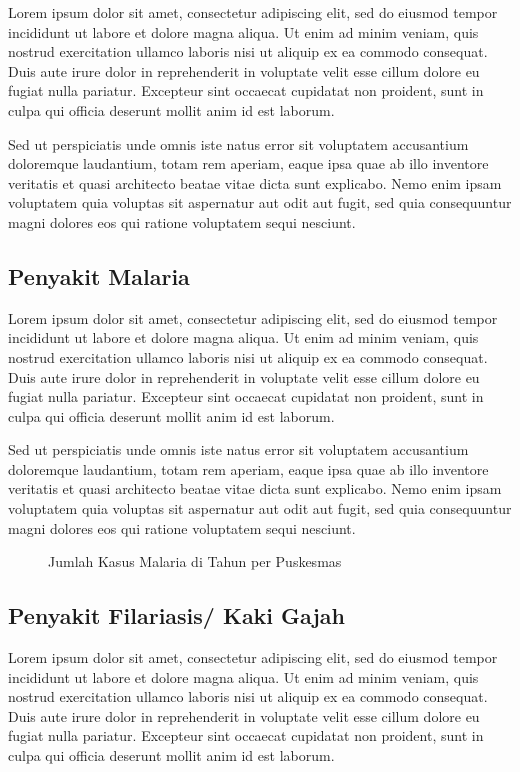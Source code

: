 Lorem ipsum dolor sit amet, consectetur adipiscing elit, sed do eiusmod tempor incididunt ut labore et dolore magna aliqua. Ut enim ad minim veniam, quis nostrud exercitation ullamco laboris nisi ut aliquip ex ea commodo consequat. Duis aute irure dolor in reprehenderit in voluptate velit esse cillum dolore eu fugiat nulla pariatur. Excepteur sint occaecat cupidatat non proident, sunt in culpa qui officia deserunt mollit anim id est laborum.

Sed ut perspiciatis unde omnis iste natus error sit voluptatem accusantium doloremque laudantium, totam rem aperiam, eaque ipsa quae ab illo inventore veritatis et quasi architecto beatae vitae dicta sunt explicabo. Nemo enim ipsam voluptatem quia voluptas sit aspernatur aut odit aut fugit, sed quia consequuntur magni dolores eos qui ratione voluptatem sequi nesciunt.

\subsection{Penyakit Malaria}
Lorem ipsum dolor sit amet, consectetur adipiscing elit, sed do eiusmod tempor incididunt ut labore et dolore magna aliqua. Ut enim ad minim veniam, quis nostrud exercitation ullamco laboris nisi ut aliquip ex ea commodo consequat. Duis aute irure dolor in reprehenderit in voluptate velit esse cillum dolore eu fugiat nulla pariatur. Excepteur sint occaecat cupidatat non proident, sunt in culpa qui officia deserunt mollit anim id est laborum.

Sed ut perspiciatis unde omnis iste natus error sit voluptatem accusantium doloremque laudantium, totam rem aperiam, eaque ipsa quae ab illo inventore veritatis et quasi architecto beatae vitae dicta sunt explicabo. Nemo enim ipsam voluptatem quia voluptas sit aspernatur aut odit aut fugit, sed quia consequuntur magni dolores eos qui ratione voluptatem sequi nesciunt.

\begin{figure}[H]
  \centering
  \caption{Jumlah Kasus Malaria di \namaKabupaten Tahun \tP per Puskesmas}
  \label{fig:Jumlah-Kasus-Malaria}
\end{figure}

\subsection{Penyakit Filariasis/ Kaki Gajah}
Lorem ipsum dolor sit amet, consectetur adipiscing elit, sed do eiusmod tempor incididunt ut labore et dolore magna aliqua. Ut enim ad minim veniam, quis nostrud exercitation ullamco laboris nisi ut aliquip ex ea commodo consequat. Duis aute irure dolor in reprehenderit in voluptate velit esse cillum dolore eu fugiat nulla pariatur. Excepteur sint occaecat cupidatat non proident, sunt in culpa qui officia deserunt mollit anim id est laborum.

